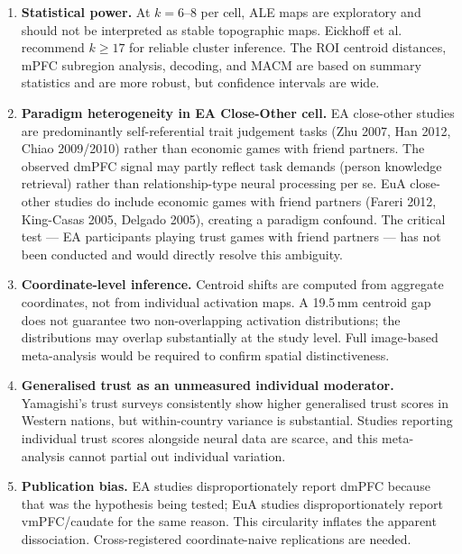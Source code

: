 \documentclass[11pt,a4paper]{article}
\begin{document}
\begin{enumerate}

\item \textbf{Statistical power.} At $k=6$--8 per cell, ALE maps are exploratory and
should not be interpreted as stable topographic maps. Eickhoff et al.\ \citeyear{Eickhoff2016}
recommend $k\geq17$ for reliable cluster inference. The ROI centroid distances, mPFC
subregion analysis, decoding, and MACM are based on summary statistics and are more robust,
but confidence intervals are wide.

\item \textbf{Paradigm heterogeneity in EA Close-Other cell.} EA close-other studies are
predominantly self-referential trait judgement tasks (Zhu 2007, Han 2012, Chiao 2009/2010)
rather than economic games with friend partners. The observed dmPFC signal may partly reflect
task demands (person knowledge retrieval) rather than relationship-type neural processing
per se. EuA close-other studies do include economic games with friend partners (Fareri 2012,
King-Casas 2005, Delgado 2005), creating a paradigm confound. The critical test — EA
participants playing trust games with friend partners — has not been conducted and would
directly resolve this ambiguity.

\item \textbf{Coordinate-level inference.} Centroid shifts are computed from aggregate
coordinates, not from individual activation maps. A 19.5\,mm centroid gap does not
guarantee two non-overlapping activation distributions; the distributions may overlap
substantially at the study level. Full image-based meta-analysis would be required to
confirm spatial distinctiveness.

\item \textbf{Generalised trust as an unmeasured individual moderator.} Yamagishi's
trust surveys consistently show higher generalised trust scores in Western nations, but
within-country variance is substantial. Studies reporting individual trust scores alongside
neural data are scarce, and this meta-analysis cannot partial out individual variation.

\item \textbf{Publication bias.} EA studies disproportionately report dmPFC because
that was the hypothesis being tested; EuA studies disproportionately report vmPFC/caudate
for the same reason. This circularity inflates the apparent dissociation. Cross-registered
coordinate-naive replications are needed.

\end{enumerate}
\end{document}
